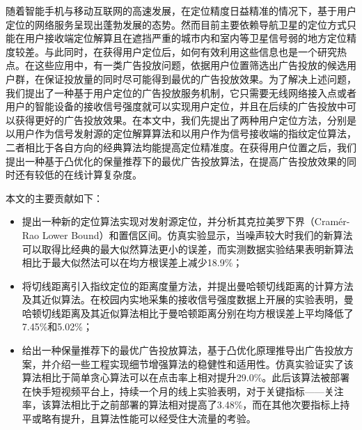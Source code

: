 \begin{cabstract}
  随着智能手机与移动互联网的高速发展，在定位精度日益精准的情况下，基于用户定位的网络服务呈现出蓬勃发展的态势。然而目前主要依赖导航卫星的定位方式只能在用户接收端定位解算且在遮挡严重的城市内和室内等卫星信号弱的地方定位精度较差。与此同时，在获得用户定位后，如何有效利用这些信息也是一个研究热点。在这些应用中，有一类广告投放问题，依据用户位置筛选出广告投放的候选用户群，在保证投放量的同时尽可能得到最优的广告投放效果。为了解决上述问题，我们提出了一种基于用户定位的广告投放服务机制，它只需要无线网络接入点或者用户的智能设备的接收信号强度就可以实现用户定位，并且在后续的广告投放中可以获得更好的广告投放效果。在本文中，我们先提出了两种用户定位方法，分别是以用户作为信号发射源的定位解算算法和以用户作为信号接收端的指纹定位算法，二者相比于各自方向的经典算法均能提高定位精准度。在获得用户位置之后，我们提出一种基于凸优化的保量推荐下的最优广告投放算法，在提高广告投放效果的同时还有较低的在线计算复杂度。

  本文的主要贡献如下：
  \begin{itemize}
    \item 提出一种新的定位算法实现对发射源定位，并分析其克拉美罗下界（Cram\'{e}r-Rao Lower Bound）和置信区间。仿真实验显示，当噪声较大时我们的新算法可以取得比经典的最大似然算法更小的误差，而实测数据实验结果表明新算法相比于最大似然法可以在均方根误差上减少18.9\%；
    \item 将切线距离引入指纹定位的距离度量方法，并提出曼哈顿切线距离的计算方法及其近似算法。在校园内实地采集的接收信号强度数据上开展的实验表明，曼哈顿切线距离及其近似算法相比于曼哈顿距离分别在均方根误差上平均降低了7.45\%和5.02\%；
    \item 给出一种保量推荐下的最优广告投放算法，基于凸优化原理推导出广告投放方案，并介绍一些工程实现细节增强算法的稳健性和适用性。仿真实验证实了该算法相比于简单贪心算法可以在点击率上相对提升29.0\%。此后该算法被部署在快手短视频平台上，持续一个月的线上实验表明，对于关键指标——关注率，该算法相比于之前部署的算法相对提高了3.48\%，而在其他次要指标上持平或略有提升，且算法性能可以经受住大流量的考验。
  \end{itemize}


\end{cabstract}


